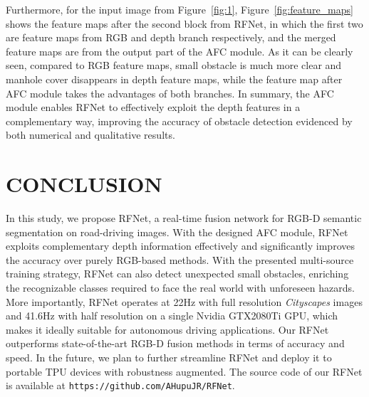\documentclass[letterpaper, 10 pt, journal, twoside]{ieeetran}
\begin{document}
Furthermore, for the input image from Figure~\ref{fig:1}, Figure~\ref{fig:feature_maps} shows the feature maps after the second block from RFNet, in which the first two are feature maps from RGB and depth branch respectively, and the merged feature maps are from the output part of the AFC module. As it can be clearly seen, compared to RGB feature maps, small obstacle is much more clear and manhole cover disappears in depth feature maps, while the feature map after AFC module takes the advantages of both branches. In summary, the AFC module enables RFNet to effectively exploit the depth features in a complementary way, improving the accuracy of obstacle detection evidenced by both numerical and qualitative results.





\section{CONCLUSION}
In this study, we propose RFNet, a real-time fusion network for RGB-D semantic segmentation on road-driving images. With the designed AFC module, RFNet exploits complementary depth information effectively and significantly improves the accuracy over purely RGB-based methods. With the presented multi-source training strategy, RFNet can also detect unexpected small obstacles, enriching the recognizable classes required to face the real world with unforeseen hazards. More importantly, RFNet operates at 22Hz with full resolution \textit{Cityscapes} images and 41.6Hz with half resolution on a single Nvidia GTX2080Ti GPU, which makes it ideally suitable for autonomous driving applications. Our RFNet outperforms state-of-the-art RGB-D fusion methods in terms of accuracy and speed. In the future, we plan to further streamline RFNet and deploy it to portable TPU devices with robustness augmented. The source code of our RFNet is available at {\tt https://github.com/AHupuJR/RFNet}.
 



\end{document}
